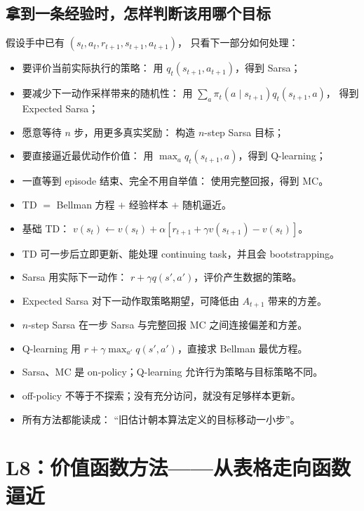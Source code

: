 \documentclass[11pt,a4paper,fontset=fandol]{ctexart}
\begin{document}
\subsection{拿到一条经验时，怎样判断该用哪个目标}

假设手中已有
\((s_t,a_t,r_{t+1},s_{t+1},a_{t+1})\)，
只看下一部分如何处理：

\begin{itemize}
  \item 要评价当前实际执行的策略：
  用 \(q_t(s_{t+1},a_{t+1})\)，得到 Sarsa；
  \item 要减少下一动作采样带来的随机性：
  用 \(\sum_a\pi_t(a\mid s_{t+1})q_t(s_{t+1},a)\)，
  得到 Expected Sarsa；
  \item 愿意等待 \(n\) 步，用更多真实奖励：
  构造 \(n\)-step Sarsa 目标；
  \item 要直接逼近最优动作价值：
  用 \(\max_a q_t(s_{t+1},a)\)，得到 Q-learning；
  \item 一直等到 episode 结束、完全不用自举值：
  使用完整回报，得到 MC。
\end{itemize}

\begin{memorybox}[L7 本章速记]
\begin{itemize}
  \item TD \(=\) Bellman 方程 \(+\) 经验样本 \(+\) 随机逼近。
  \item 基础 TD：
  \(v(s_t)\leftarrow v(s_t)+\alpha[r_{t+1}+\gamma v(s_{t+1})-v(s_t)]\)。
  \item TD 可一步后立即更新、能处理 continuing task，并且会 bootstrapping。
  \item Sarsa 用实际下一动作：
  \(r+\gamma q(s',a')\)，评价产生数据的策略。
  \item Expected Sarsa 对下一动作取策略期望，可降低由 \(A_{t+1}\) 带来的方差。
  \item \(n\)-step Sarsa 在一步 Sarsa 与完整回报 MC 之间连接偏差和方差。
  \item Q-learning 用
  \(r+\gamma\max_{a'}q(s',a')\)，直接求 Bellman 最优方程。
  \item Sarsa、MC 是 on-policy；Q-learning 允许行为策略与目标策略不同。
  \item off-policy 不等于不探索；没有充分访问，就没有足够样本更新。
  \item 所有方法都能读成：
  “旧估计朝本算法定义的目标移动一小步”。
\end{itemize}
\end{memorybox}

\clearpage
\section{L8：价值函数方法——从表格走向函数逼近}
\end{document}
